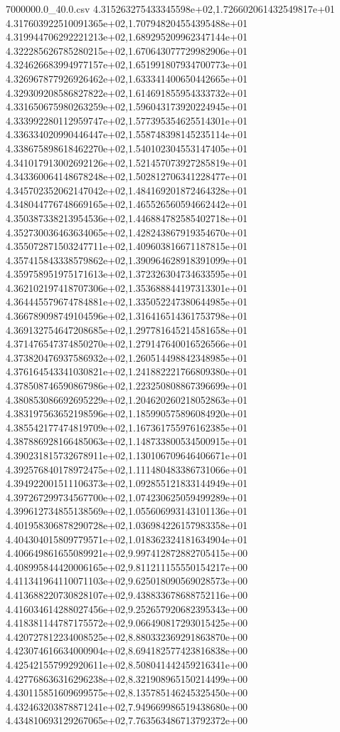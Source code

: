 \begin{filecontents*}{7000000.0_40.0.csv}
4.315263275433345598e+02,1.726602061432549817e+01
4.317603922510091365e+02,1.707948204554395488e+01
4.319944706292221213e+02,1.689295209962347144e+01
4.322285626785280215e+02,1.670643077729982906e+01
4.324626683994977157e+02,1.651991807934700773e+01
4.326967877926926462e+02,1.633341400650442665e+01
4.329309208586827822e+02,1.614691855954333732e+01
4.331650675980263259e+02,1.596043173920224945e+01
4.333992280112959747e+02,1.577395354625514301e+01
4.336334020990446447e+02,1.558748398145235114e+01
4.338675898618462270e+02,1.540102304553147405e+01
4.341017913002692126e+02,1.521457073927285819e+01
4.343360064148678248e+02,1.502812706341228477e+01
4.345702352062147042e+02,1.484169201872464328e+01
4.348044776748669165e+02,1.465526560594662442e+01
4.350387338213954536e+02,1.446884782585402718e+01
4.352730036463634065e+02,1.428243867919354670e+01
4.355072871503247711e+02,1.409603816671187815e+01
4.357415843338579862e+02,1.390964628918391099e+01
4.359758951975171613e+02,1.372326304734633595e+01
4.362102197418707306e+02,1.353688844197313301e+01
4.364445579674784881e+02,1.335052247380644985e+01
4.366789098749104596e+02,1.316416514361753798e+01
4.369132754647208685e+02,1.297781645214581658e+01
4.371476547374850270e+02,1.279147640016526566e+01
4.373820476937586932e+02,1.260514498842348985e+01
4.376164543341030821e+02,1.241882221766809380e+01
4.378508746590867986e+02,1.223250808867396699e+01
4.380853086692695229e+02,1.204620260218052863e+01
4.383197563652198596e+02,1.185990575896084920e+01
4.385542177474819709e+02,1.167361755976162385e+01
4.387886928166485063e+02,1.148733800534500915e+01
4.390231815732678911e+02,1.130106709646406671e+01
4.392576840178972475e+02,1.111480483386731066e+01
4.394922001511106373e+02,1.092855121833144949e+01
4.397267299734567700e+02,1.074230625059499289e+01
4.399612734855138569e+02,1.055606993143101136e+01
4.401958306878290728e+02,1.036984226157983358e+01
4.404304015809779571e+02,1.018362324181634904e+01
4.406649861655089921e+02,9.997412872882705415e+00
4.408995844420006165e+02,9.811211155550154217e+00
4.411341964110071103e+02,9.625018090569028573e+00
4.413688220730828107e+02,9.438833678688752116e+00
4.416034614288027456e+02,9.252657920682395343e+00
4.418381144787175572e+02,9.066490817293015425e+00
4.420727812234008525e+02,8.880332369291863870e+00
4.423074616634000904e+02,8.694182577423816838e+00
4.425421557992920611e+02,8.508041442459216341e+00
4.427768636316296238e+02,8.321908965150214499e+00
4.430115851609699575e+02,8.135785146245325450e+00
4.432463203878871241e+02,7.949669986519438680e+00
4.434810693129267065e+02,7.763563486713792372e+00

\end{filecontents*}
